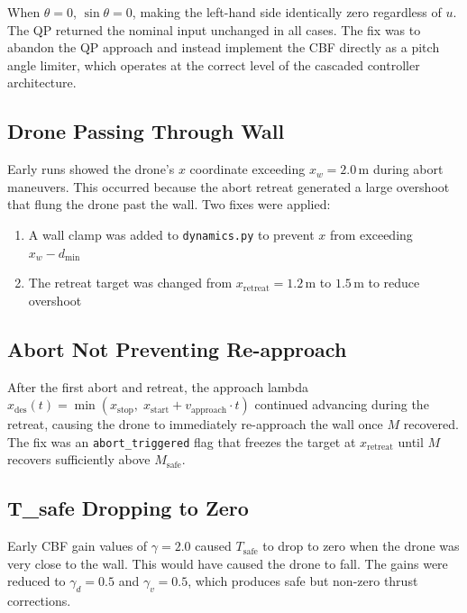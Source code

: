 \documentclass[12pt]{article}
\begin{document}
When $\theta = 0$, $\sin\theta = 0$, making the left-hand side
identically zero regardless of $u$. The QP returned the nominal
input unchanged in all cases. The fix was to abandon the QP approach
and instead implement the CBF directly as a pitch angle limiter,
which operates at the correct level of the cascaded controller
architecture.

\subsection{Drone Passing Through Wall}

Early runs showed the drone's $x$ coordinate exceeding $x_w = 2.0$\,m
during abort maneuvers. This occurred because the abort retreat
generated a large overshoot that flung the drone past the wall. Two
fixes were applied:

\begin{enumerate}
    \item A wall clamp was added to \texttt{dynamics.py} to prevent
          $x$ from exceeding $x_w - d_{\min}$
    \item The retreat target was changed from $x_\mathrm{retreat}
          = 1.2$\,m to $1.5$\,m to reduce overshoot
\end{enumerate}

\subsection{Abort Not Preventing Re-approach}

After the first abort and retreat, the approach lambda
$x_\mathrm{des}(t) = \min(x_\mathrm{stop},\; x_\mathrm{start}
+ v_\mathrm{approach} \cdot t)$ continued advancing during the
retreat, causing the drone to immediately re-approach the wall once
$M$ recovered. The fix was an \texttt{abort\_triggered} flag that
freezes the target at $x_\mathrm{retreat}$ until $M$ recovers
sufficiently above $M_\mathrm{safe}$.

\subsection{T\_safe Dropping to Zero}

Early CBF gain values of $\gamma = 2.0$ caused $T_\mathrm{safe}$ to
drop to zero when the drone was very close to the wall. This would
have caused the drone to fall. The gains were reduced to
$\gamma_d = 0.5$ and $\gamma_v = 0.5$, which produces safe but
non-zero thrust corrections.
\end{document}
